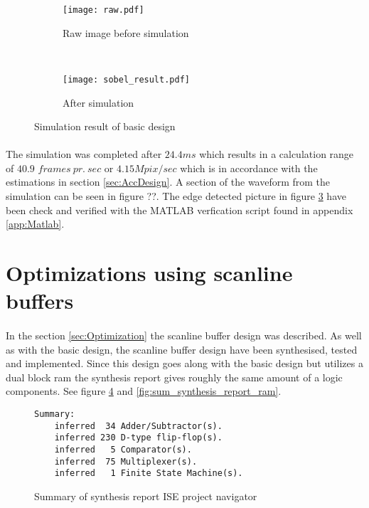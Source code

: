 \begin{figure}[H]
	\centering
	\begin{subfigure}[b]{0.4\textwidth}
		\texttt{[image: raw.pdf]}
		\caption{Raw image before simulation}
		\label{fig:test_picture_raw}
    \end{subfigure}%
        ~ %
    \begin{subfigure}[b]{0.4\textwidth}
    	\texttt{[image: sobel\_result.pdf]}
    	\caption{After simulation}
    	\label{fig:test_picture_sobel}
	\end{subfigure}
	\caption{Simulation result of basic design}
\end{figure}

\paragraph*{}
The simulation was completed after $24.4ms$ which results in a calculation range of $40.9$ $frames~pr.~sec$ or $4.15Mpix/sec$ which is in accordance with the estimations in section \ref{sec:AccDesign}. A section of the waveform from the simulation can be seen in figure ??. The edge detected picture in figure \ref{fig:test_picture_sobel} have been check and verified with the MATLAB verfication script found in appendix \ref{app:Matlab}.   

\section{Optimizations using scanline buffers}
\paragraph*{}
In the section \ref{sec:Optimization} the scanline buffer design was described. As well as with the basic design, the scanline buffer design have been synthesised, tested and implemented. Since this design goes along with the basic design but utilizes a dual block ram the synthesis report gives roughly the same amount of a logic components. See figure \ref{fig:sum_synthesis_report} and \ref{fig:sum_synthesis_report_ram}.   
    
\begin{figure}[H]
\centering
\begin{BVerbatim}
Summary:
    inferred  34 Adder/Subtractor(s).
    inferred 230 D-type flip-flop(s).
    inferred   5 Comparator(s).
    inferred  75 Multiplexer(s).
    inferred   1 Finite State Machine(s).
\end{BVerbatim}
\caption{Summary of synthesis report ISE project navigator}
\label{fig:sum_synthesis_report}
\end{figure}

